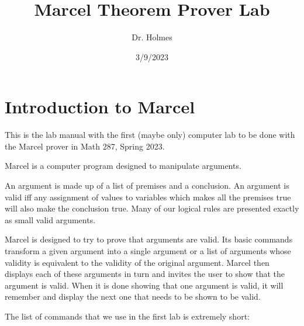 \documentclass[12pt]{article}
\title{Marcel Theorem Prover Lab}
\author{Dr. Holmes}
\date{3/9/2023}
\begin{document}
\maketitle

\section{Introduction to Marcel}

This is the lab manual with the first (maybe only) computer lab to be done with the Marcel prover in Math 287, Spring 2023.

Marcel is a computer program designed to manipulate arguments.

An argument is made up of a list of premises and a conclusion.  An argument is valid iff any assignment of values to variables which makes all the premises
true will also make the conclusion true.  Many of our logical rules are presented exactly as small valid arguments.

Marcel is designed to try to prove that arguments are valid.  Its basic commands transform a given argument into a single argument or a list of arguments
whose validity is equivalent to the validity of the original argument.  Marcel then displays each of these arguments in turn and invites the user to show that the argument is valid.  When it is done showing that one argument is valid, it will remember and display the next one that needs to be shown to be valid.

The list of commands that we use in the first lab is extremely short:
\end{document}
